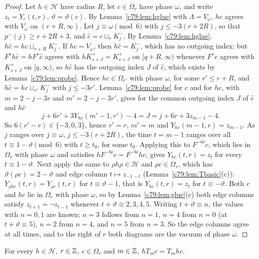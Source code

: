 \begin{proof}
Let $h\in\mathcal H$ have radius $R$, let $c\in\Omega_r$ have phase $\omega$, and write $z_t=Y_c(t,r)$, $\vartheta=\vartheta(c)$. By Lemma~\ref{c79:lem:hglue} with $\Lambda=V_\omega$, $hc$ agrees with $V_\omega$ on $(r+R,\infty)$. Let $j\equiv\omega\pmod 6$ with $j\le-3(r+2R)$, so that $p^-(j)\ge r+2R+3$, and $\hat c=c\sqcup_rK^-_j$. By Lemma~\ref{c79:lem:hglue}, $h{\hat c}=hc\sqcup_{r+R}K^-_j$. If $hc=V_\omega$, then $h{\hat c}=K^-_j$, which has no outgoing index; but $F^sh{\hat c}=hF^s{\hat c}$ agrees with $hK^+_{s+J}=K^+_{s+J}$ on $[q+R,\infty)$ whenever $F^s{\hat c}$ agrees with $K^+_{s+J}$ on $[q,\infty)$, so $h{\hat c}$ has the outgoing index $J$ of $\hat c$, which exists by Lemma~\ref{c79:lem:probe}. Hence $hc\in\Omega_{r'}$ with phase $\omega$, for some $r'\le r+R$, and $h{\hat c}=hc\sqcup_{r'}K^-_j$ with $j\le-3r'$. Lemma~\ref{c79:lem:probe} for $c$ and for $hc$, with $m=2-j-3r$ and $m'=2-j-3r'$, gives for the common outgoing index $J$ of $\hat c$ and $h\hat c$
\[
j+6r'+3Y_{hc}(m'-1,r')-4=J=j+6r+3z_{m-1}-4.
\]
So $6(r'-r)\in\{-3,0,3\}$, hence $r'=r$, $m'=m$ and $Y_{hc}(m-1,r)=z_{m-1}$. As $j$ ranges over $j\equiv\omega$, $j\le-3(r+2R)$, the time $t=m-1$ ranges over all $t\equiv1-\vartheta\pmod6$ with $t\ge t_0$, for some $t_0$. Applying this to $F^{-6i}c$, which lies in $\Omega_r$ with phase $\omega$ and satisfies $hF^{-6i}c=F^{-6i}hc$, gives $Y_{hc}(t,r)=z_t$ for every $t\equiv1-\vartheta$. Next apply the same to $\rho h\rho\in\mathcal H$ and $\rho c\in\Omega_r$, which has $\vartheta(\rho c)=2-\vartheta$ and edge column $t\mapsto z_{-1-t}$ (Lemma~\ref{c79:lem:Tbasic}(c)): $Y_{\rho hc}(t,r)=Y_{\rho c}(t,r)$ for $t\equiv\vartheta-1$, that is $Y_{hc}(t,r)=z_t$ for $t\equiv-\vartheta$. Both $c$ and $hc$ lie in $\Omega_r$ with phase $\omega$, so by Lemma~\ref{c79:lem:glue}(c) both edge columns satisfy $z_{t+1}=\neg z_{t-1}$ whenever $t+\vartheta\equiv2,3,4,5$. Writing $t+\vartheta\equiv n$, the values with $n=0,1$ are known; $n=3$ follows from $n=1$, $n=4$ from $n=0$ (at $t+\vartheta\equiv5$), $n=2$ from $n=4$, and $n=5$ from $n=3$. So the edge columns agree at all times, and to the right of $r$ both diagrams are the vacuum of phase $\omega$.
\end{proof}

\begin{lemma}\label{c79:lem:commute}
For every $h\in\mathcal H$, $r\in\mathbb{Z}$, $c\in\Omega_r$ and $m\in\mathbb{Z}$, $hT_mc=T_mhc$.
\end{lemma}


